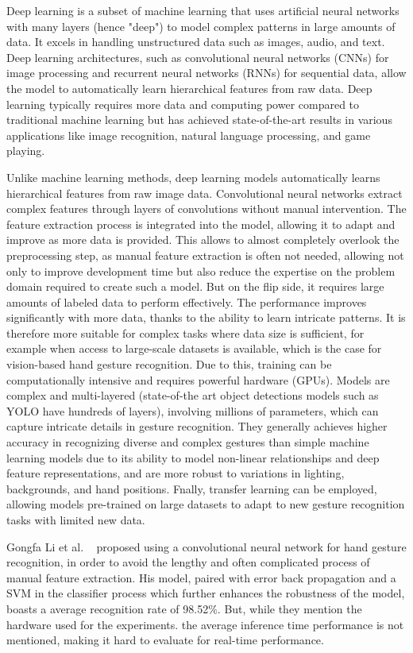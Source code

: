 \documentclass[12pt]{article}
\begin{document}
Deep learning is a subset of machine learning that uses artificial neural networks with many layers (hence "deep") to model complex patterns in large amounts of data. It excels in handling unstructured data such as images, audio, and text. Deep learning architectures, such as convolutional neural networks (CNNs) for image processing and recurrent neural networks (RNNs) for sequential data, allow the model to automatically learn hierarchical features from raw data. Deep learning typically requires more data and
computing power compared to traditional machine learning but has achieved state-of-the-art results in various applications like image recognition, natural language processing, and game playing.

Unlike machine learning methods, deep learning models automatically learns hierarchical features from raw image data. Convolutional neural networks extract complex features through layers of convolutions without manual intervention. The feature extraction process is integrated into the model, allowing it to adapt and improve as more data is provided. This allows to almost completely overlook the preprocessing step, as manual feature extraction is often not needed, allowing not only to improve development time but also reduce the expertise on the problem domain required to create such a model. But on the flip side, it requires large amounts of labeled data to perform effectively. The performance improves significantly with more data, thanks to the ability to learn intricate patterns. It is therefore more suitable for complex tasks where data size is sufficient, for example when access to large-scale datasets is available, which is the case for vision-based hand gesture recognition. Due to this, training can be computationally intensive and requires powerful hardware (GPUs).
Models are complex and multi-layered (state-of-the art object detections models such as YOLO have hundreds of layers), involving millions of parameters, which can capture intricate details in gesture recognition. They generally achieves higher accuracy in recognizing diverse and complex gestures than simple machine learning models due to its ability to model non-linear relationships and deep feature representations, and are more robust to variations in lighting, backgrounds, and hand positions. Fnally, transfer learning can be employed, allowing models pre-trained on large datasets to adapt to new gesture recognition tasks with limited new data. 

Gongfa Li et al. ~\cite{li2019hand} proposed using a convolutional neural network for hand gesture recognition, in order to avoid the lengthy and often complicated process of manual feature extraction. His model, paired with error back propagation and a SVM in the classifier process which further enhances the robustness of the model, boasts a average recognition rate of 98.52\%. But, while they mention the hardware used for the experiments. the average inference time performance is not mentioned, making it hard to evaluate for real-time performance.
\end{document}
